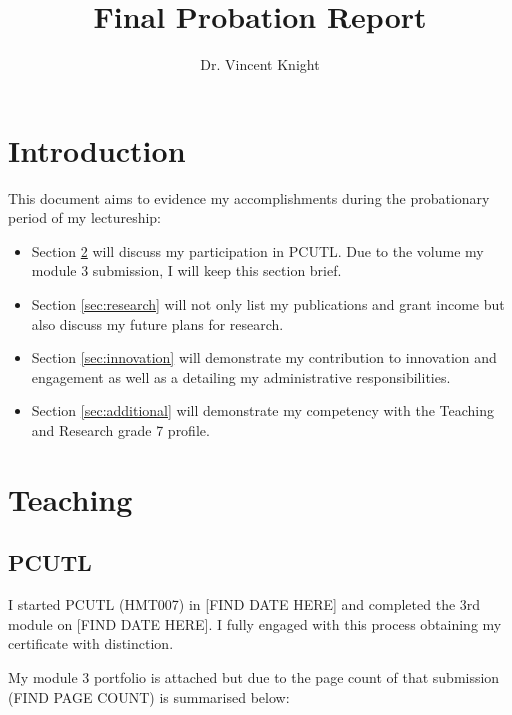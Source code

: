\documentclass{article}
\title{Final Probation Report}
\author{Dr. Vincent Knight}
\begin{document}
\maketitle

\section{Introduction}\label{sec:introduction}

This document aims to evidence my accomplishments during the probationary period of my lectureship:

\begin{itemize}
    \item Section \ref{sec:teaching} will discuss my participation in PCUTL.
    Due to the volume my module 3 submission, I will keep this section brief.
    \item Section \ref{sec:research} will not only list my publications and grant income but also discuss my future plans for research.
    \item Section \ref{sec:innovation} will demonstrate my contribution to innovation and engagement as well as a detailing my administrative responsibilities.
    \item Section \ref{sec:additional} will demonstrate my competency with the Teaching and Research grade 7 profile.
\end{itemize}

\section{Teaching}\label{sec:teaching}

\subsection{PCUTL}

I started PCUTL (HMT007) in [FIND DATE HERE] and completed the 3rd module on [FIND DATE HERE]. I fully engaged with this process obtaining my certificate with distinction.

My module 3 portfolio is attached but due to the page count of that submission (FIND PAGE COUNT) is summarised below:
\end{document}

